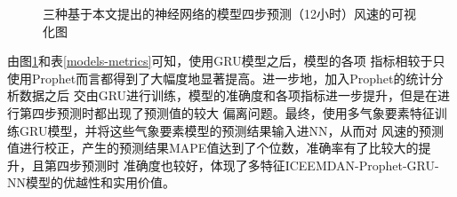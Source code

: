 \documentclass[AutoFakeBold]{LZUThesis}
\begin{document}
\begin{figure}[H]
	\centering
    \caption{三种基于本文提出的神经网络的模型四步预测（12小时）风速的可视化图}
    \label{fig_gru_predict_test}
\end{figure}

由图\ref{fig_gru_predict_test}和表\ref{models-metrics}可知，使用GRU模型之后，模型的各项
指标相较于只使用Prophet而言都得到了大幅度地显著提高。进一步地，加入Prophet的统计分析数据之后
交由GRU进行训练，模型的准确度和各项指标进一步提升，但是在进行第四步预测时都出现了预测值的较大
偏离问题。最终，使用多气象要素特征训练GRU模型，并将这些气象要素模型的预测结果输入进NN，从而对
风速的预测值进行校正，产生的预测结果MAPE值达到了个位数，准确率有了比较大的提升，且第四步预测时
准确度也较好，体现了多特征ICEEMDAN-Prophet-GRU-NN模型的优越性和实用价值。
\end{document}
